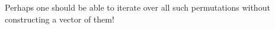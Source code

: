 
\begin{DoxyRefList}
\item[\label{todo__todo000001}%
\hypertarget{todo__todo000001}{}%
Member \hyperlink{classdscr_1_1basic__combinations_a3f536b237cc48cdf74a85de956201233}{dscr\-:\-:basic\-\_\-combinations$<$ Int\-Type $>$\-:\-:find\-\_\-all} (Partial\-Predicate pred)]Perhaps one should be able to iterate over all such permutations without constructing a vector of them!
\end{DoxyRefList}